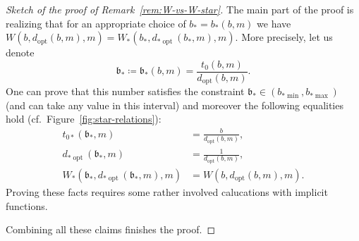 \documentclass[a4paper]{amsart} %
\theoremstyle{definition}
\theoremstyle{remark}
\numberwithin{equation}{section}
\newcommand*{\bStar}{b_*}
\newcommand*{\tZeroStar}{t_{0*}}
\newcommand*{\XXXspecialbd}{W}
\newcommand*{\XXXspecialbdStar}{W_*}
\newcommand*{\bMin}{b_{\min}}
\newcommand*{\bMax}{b_{\max}}
\newcommand*{\dOpt}{d_{\mathrm{opt}}}
\newcommand*{\bMinStar}{b_{*\!\min}}
\newcommand*{\bMaxStar}{b_{*\!\max}}
\newcommand*{\dOptStar}{d_{*\!\operatorname{opt}}}
\newcommand*{\bMinTildeStar}{\widetilde{b}_{*\!\min}}
\newcommand*{\bStarWvsWStar}{\mathfrak{b}_*}
\begin{document}
\begin{proof}[Sketch of the proof of Remark~\ref{rem:W-vs-W-star}]
The main part of the proof is realizing that for an appropriate choice of $\bStar=\bStar(b,m)$
we have $\XXXspecialbd(b,\dOpt(b,m),m) = \XXXspecialbdStar(\bStar,\dOptStar(\bStar,m),m)$.
More precisely,  let us denote 
\[
\bStarWvsWStar \coloneqq \bStarWvsWStar (b,m) =  \frac{t_0(b,m)}{\dOpt(b,m)}.
\]
One can prove that this number satisfies the constraint $\bStarWvsWStar\in (\bMinStar, \bMaxStar)$ (and can take any value in this interval)
 and moreover the following  equalities hold (cf.\ Figure~\ref{fig:star-relations}):
\begin{align*}
\tZeroStar(\bStarWvsWStar,m) %
&= \frac{b}{\dOpt(b,m)},\\
\dOptStar(\bStarWvsWStar,m) %
&= \frac{1}{\dOpt(b,m)},\\
\XXXspecialbdStar(\bStarWvsWStar, \dOptStar(\bStarWvsWStar,m), m) 
&= 	\XXXspecialbd(b,\dOpt(b,m),m).
\end{align*}
Proving these facts requires some rather involved calucations with implicit functions.

Combining all these claims finishes the proof.
\end{proof}
\end{document}
